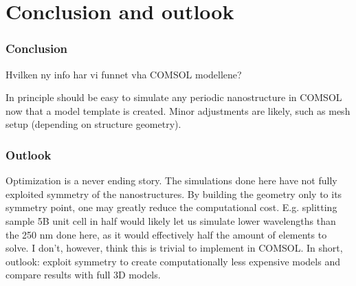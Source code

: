 
\chapter{Conclusion and outlook}

\subsection*{Conclusion}

Hvilken ny info har vi funnet vha COMSOL modellene?

In principle should be easy to simulate any periodic nanostructure in COMSOL now that a model template is created. Minor adjustments are likely, such as mesh setup (depending on structure geometry).


\subsection*{Outlook}
Optimization is a never ending story. The simulations done here have not fully exploited symmetry of the nanostructures. By building the geometry only to its symmetry point, one may greatly reduce the computational cost. E.g. splitting sample 5B unit cell in half would likely let us simulate lower wavelengths than the 250 nm done here, as it would effectively half the amount of elements to solve. I don't, however, think this is trivial to implement in COMSOL. In short, outlook: exploit symmetry to create computationally less expensive models and compare results with full 3D models.



\cleardoublepage